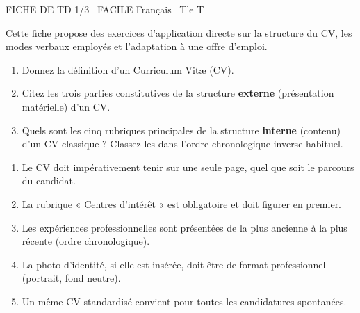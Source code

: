 \documentclass[11pt]{article}
\begin{document}
\begin{tcolorbox}[enhanced,colback=popink,colframe=popink,arc=10pt,boxrule=0pt,left=12pt,right=12pt,top=9pt,bottom=9pt]
{\color{white}\popxbold\small FICHE DE TD 1/3 \textbullet\ FACILE \hfill Français \textbullet\ Tle T\par}
\end{tcolorbox}
\vspace{4pt}
Cette fiche propose des exercices d'application directe sur la structure du CV, les modes verbaux employés et l'adaptation à une offre d'emploi.

\begin{exercice}
\begin{enumerate}
    \item Donnez la définition d'un Curriculum Vitæ (CV).
    \item Citez les trois parties constitutives de la structure \textbf{externe} (présentation matérielle) d'un CV.
    \item Quels sont les cinq rubriques principales de la structure \textbf{interne} (contenu) d'un CV classique ? Classez-les dans l'ordre chronologique inverse habituel.
\end{enumerate}
\end{exercice}

\begin{exercice}
\begin{enumerate}
    \item Le CV doit impérativement tenir sur une seule page, quel que soit le parcours du candidat.
    \item La rubrique « Centres d'intérêt » est obligatoire et doit figurer en premier.
    \item Les expériences professionnelles sont présentées de la plus ancienne à la plus récente (ordre chronologique).
    \item La photo d'identité, si elle est insérée, doit être de format professionnel (portrait, fond neutre).
    \item Un même CV standardisé convient pour toutes les candidatures spontanées.
\end{enumerate}
\end{exercice}
\end{document}
